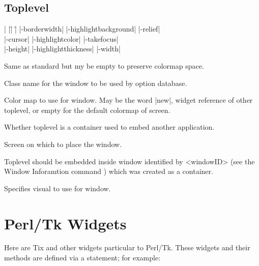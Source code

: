 \subsection*{Toplevel}
\vspace{-4pt}

\begin{tabbing}
|                   |\=|                     |\= \kill
|-borderwidth| \> |-highlightbackground|     \> |-relief| \\   
|-cursor|      \> |-highlightcolor|          \> |-takefocus| \\
|-height|      \> |-highlightthickness|      \> |-width| \\
\end{tabbing}

\vskip5pt
\begin{enum}{1cm}

Same as standard but my be empty to preserve colormap space.

Class name for the window to be used by option database.

Color map to use for window. May be the word |new|, widget reference of
other toplevel, or empty for the default colormap of screen.

Whether toplevel is a container used to embed another application.

Screen on which to place the window.

Toplevel should be embedded inside window identified by <windowID>
(see the Window Inforamtion command ) which was created as a container.
 
Specifies visual to use for window.

\end{enum}

\newpage

\section{Perl/Tk Widgets}
Here are Tix and other widgets particular to Perl/Tk.  These widgets 
and their methods are defined via a  statement; for example:

